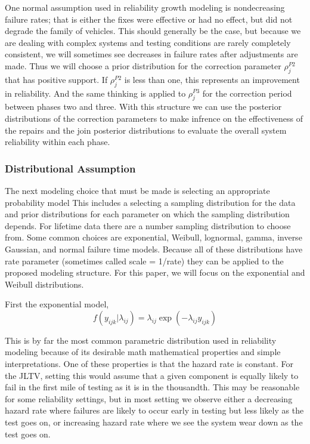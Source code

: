 \documentclass[12pt]{article}
\begin{document}
One normal assumption used in reliability growth modeling is nondecreasing
failure rates; that is either the fixes were effective or had no effect, but did
not degrade the family of vehicles.  This should generally be the case, but
because we are dealing with complex systems and testing conditions are rarely
completely consistent, we will sometimes see decreases in failure rates after
adjustments are made.  Thus we will choose a prior distribution for the
correction parameter $\rho_{j}^{P2}$ that has positive support.  If
$\rho_{j}^{P2}$ is less than one, this represents an improvement in reliability.
And the same thinking is applied to $\rho_{j}^{P3}$ for the correction period
between phases two and three.  With this structure we can use the posterior
distributions of the correction parameters to make infrence on the effectiveness
of the repairs and the join posterior distributions to evaluate the overall
system reliability within each phase.

\subsubsection{Distributional Assumption}
The next modeling choice that must be made is selecting an appropriate
probability model This includes a selecting a sampling distribution for the data
and prior distributions for each parameter on which the sampling distribution
depends.  For lifetime data there are a number sampling distribution to choose
from.  Some common choices are exponential, Weibull, lognormal, gamma, inverse
Gaussian, and normal failure time models.  Because all of these distributions
have rate parameter (sometimes called scale = 1/rate) they can be applied to
the proposed modeling structure.  For this paper, we will focus on the
exponential and Weibull distributions.

First the exponential model,
\begin{equation*}
    f(y_{ijk}|\lambda_{ij})=\lambda_{ij} \exp(-\lambda_{ij}y_{ijk})
\end{equation*}

This is by far the most common parametric distribution used in reliability
modeling because of its desirable math mathematical properties and simple
interpretations.  One of these properties is that the hazard rate is constant.
For the JLTV, setting this would assume that a given component is equally likely
to fail in the first mile of testing as it is in the thousandth.  This may be
reasonable for some reliability settings, but in most setting we observe either
a decreasing hazard rate where failures are likely to occur early in testing
but less likely as the test goes on, or increasing hazard rate where we see the
system wear down as the test goes on.
\end{document}
